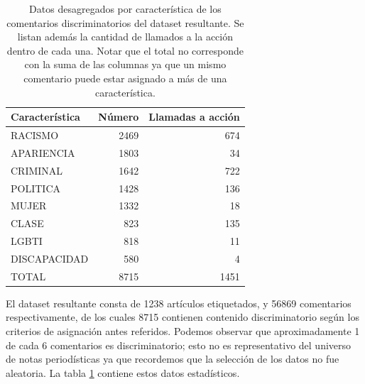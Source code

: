 \begin{table}
    \centering
    \begin{tabular}{lrr}
        \toprule
        Característica &  Número &  Llamadas a acción \\
        \midrule
        RACISMO        &   2469 &              674 \\
        APARIENCIA     &   1803 &               34 \\
        CRIMINAL       &   1642 &              722 \\
        POLITICA       &   1428 &              136 \\
        MUJER          &   1332 &               18 \\
        CLASE          &    823 &              135 \\
        LGBTI          &    818 &               11 \\
        DISCAPACIDAD   &    580 &                4 \\
        TOTAL          &   8715 &             1451 \\
        \bottomrule
    \end{tabular}
    \caption{Datos desagregados por característica de los comentarios discriminatorios del dataset resultante. Se listan además la cantidad de llamados a la acción dentro de cada una. Notar que el total no corresponde con la suma de las columnas ya que un mismo comentario puede estar asignado a más de una característica.}
    \label{tab:dataset_figures}

\end{table}

El dataset resultante consta de 1238 artículos etiquetados, y 56869 comentarios respectivamente, de los cuales 8715 contienen contenido discriminatorio según los criterios de asignación antes referidos. Podemos observar que aproximadamente 1 de cada 6 comentarios es discriminatorio; esto no es representativo del universo de notas periodísticas ya que recordemos que la selección de los datos no fue aleatoria. La tabla \ref{tab:dataset_figures} contiene estos datos estadísticos.

